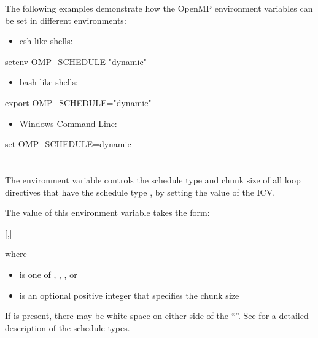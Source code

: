 The following examples demonstrate how the OpenMP environment variables can
be set in different environments:

\begin{itemize}
\item csh-like shells:
\end{itemize}

\begin{ompEnv}
setenv OMP_SCHEDULE "dynamic"
\end{ompEnv}

\begin{itemize}
\item bash-like shells:
\end{itemize}

\begin{ompEnv}
export OMP_SCHEDULE="dynamic"
\end{ompEnv}

\begin{itemize}
\item Windows Command Line:
\end{itemize}

\begin{ompEnv}
set OMP_SCHEDULE=dynamic
\end{ompEnv}


\section{}
\label{sec:OMP_SCHEDULE}
The  environment variable controls the schedule type and chunk size
of all loop directives that have the schedule type , by setting the value of the
 ICV.

The value of this environment variable takes the form:

[,]

where

\begin{itemize}
\item {} is one of , , , or 

\item {} is an optional positive integer that specifies the chunk size
\end{itemize}

If  is present, there may be white space on either side of the ``\code{,}''. See
 for a detailed description of the schedule types.

